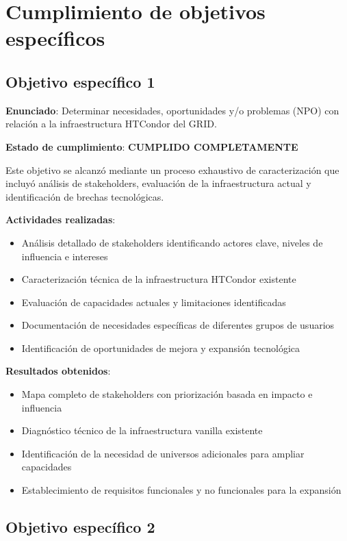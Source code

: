 \section{Cumplimiento de objetivos específicos}
\noindent

\subsection{Objetivo específico 1}
\noindent

\textbf{Enunciado}: Determinar necesidades, oportunidades y/o problemas (NPO) con relación a la infraestructura HTCondor del GRID.

\textbf{Estado de cumplimiento}: \textbf{CUMPLIDO COMPLETAMENTE}

Este objetivo se alcanzó mediante un proceso exhaustivo de caracterización que incluyó análisis de stakeholders, evaluación de la infraestructura actual y identificación de brechas tecnológicas.

\textbf{Actividades realizadas}:
\begin{itemize}
    \item Análisis detallado de stakeholders identificando actores clave, niveles de influencia e intereses
    \item Caracterización técnica de la infraestructura HTCondor existente
    \item Evaluación de capacidades actuales y limitaciones identificadas
    \item Documentación de necesidades específicas de diferentes grupos de usuarios
    \item Identificación de oportunidades de mejora y expansión tecnológica
\end{itemize}

\textbf{Resultados obtenidos}:
\begin{itemize}
    \item Mapa completo de stakeholders con priorización basada en impacto e influencia
    \item Diagnóstico técnico de la infraestructura vanilla existente
    \item Identificación de la necesidad de universos adicionales para ampliar capacidades
    \item Establecimiento de requisitos funcionales y no funcionales para la expansión
\end{itemize}

\subsection{Objetivo específico 2}
\noindent

